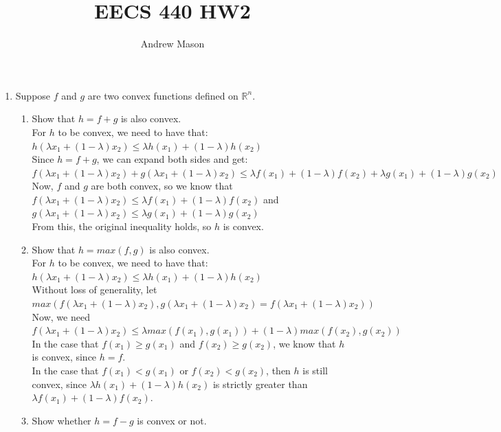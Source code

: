 \documentclass[12pt]{article}
\author{Andrew Mason}
\title{EECS 440 HW2}
\begin{document}
\maketitle

\begin{enumerate}
  \item Suppose $f$ and $g$ are two convex functions defined on
  $\mathbb{R}^n$.
  \begin{enumerate}
    \item Show that $h = f + g$ is also convex.\\

    For $h$ to be convex, we need to have that:\\
    $h(\lambda x_1 + (1 - \lambda)x_2) \leq
      \lambda h(x_1) + (1 - \lambda)h(x_2)$\\
    Since $h = f + g$, we can expand both sides and get:\\
    $f(\lambda x_1 + (1 - \lambda)x_2) + g(\lambda x_1 + (1 - \lambda)x_2)
      \leq\lambda f(x_1) + (1 - \lambda)f(x_2) +
      \lambda g(x_1) + (1 - \lambda)g(x_2)$\\
    Now, $f$ and $g$ are both convex, so we know that
      $f(\lambda x_1 + (1 - \lambda)x_2)\leq
      \lambda f(x_1) + (1 - \lambda)f(x_2)$ and
      $g(\lambda x_1 + (1 - \lambda)x_2)\leq
      \lambda g(x_1) + (1 - \lambda)g(x_2)$\\
    From this, the original inequality holds, so $h$ is convex.
    \item Show that $h = max(f, g)$ is also convex.\\

    For $h$ to be convex, we need to have that:\\
    $h(\lambda x_1 + (1 - \lambda)x_2) \leq
      \lambda h(x_1) + (1 - \lambda)h(x_2)$\\
    Without loss of generality, let $max(
      f(\lambda x_1 + (1 - \lambda)x_2),
      g(\lambda x_1 + (1 - \lambda)x_2) =
      f(\lambda x_1 + (1 - \lambda)x_2))$\\
    Now, we need $f(\lambda x_1 + (1 - \lambda)x_2)\leq
      \lambda max(f(x_1), g(x_1)) + (1 - \lambda)max(f(x_2), g(x_2))$\\
    In the case that $f(x_1)\geq g(x_1)$ and $f(x_2)\geq g(x_2)$, we know
      that $h$ is convex, since $h = f$.\\
    In the case that $f(x_1) < g(x_1)$ or $f(x_2) < g(x_2)$, then $h$ is
      still convex, since $\lambda h(x_1) + (1 - \lambda)h(x_2)$ is
      strictly greater than $\lambda f(x_1) + (1 - \lambda)f(x_2)$.
    \item Show whether $h = f - g$ is convex or not.\\


\end{enumerate}
\end{enumerate}
\end{document}
